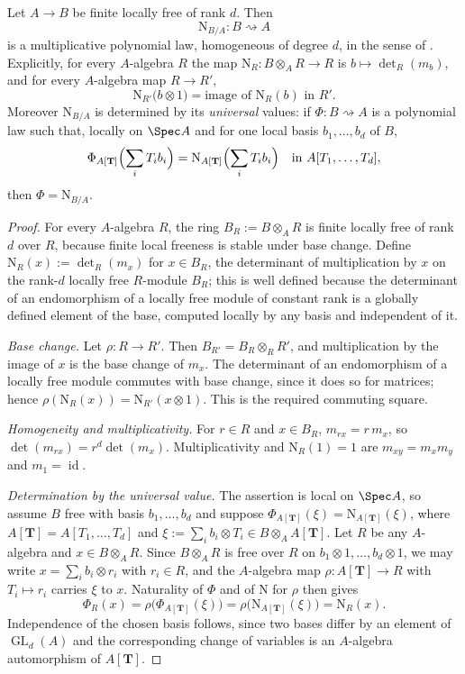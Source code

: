 \begin{proposition}
\label{prop:ch41-norm-law}
Let $A\to B$ be finite locally free of rank $d$.  Then
\[
 \mathrm N_{B/A}:B\rightsquigarrow A
\]
is a multiplicative polynomial law, homogeneous of degree $d$, in the
sense of .  Explicitly, for every
$A$-algebra $R$ the map
$\mathrm N_R:B\otimes_AR\to R$ is
$b\mapsto\det_R(m_b)$, and for every $A$-algebra map $R\to R'$,
\[
 \mathrm N_{R'}\bigl(b\otimes1\bigr)
 =\text{image of }\mathrm N_R(b)\text{ in }R' .
\]
Moreover $\mathrm N_{B/A}$ is determined by its \emph{universal} values:
if $\Phi:B\rightsquigarrow A$ is a polynomial law such that, locally on
$\Spec A$ and for one local basis $b_1,\dots,b_d$ of $B$,
\[
 \Phi_{A[\mathbf T]}\Bigl(\sum_iT_ib_i\Bigr)
 =\mathrm N_{A[\mathbf T]}\Bigl(\sum_iT_ib_i\Bigr)
 \quad\text{in }A[T_1,\dots,T_d],
\]
then $\Phi=\mathrm N_{B/A}$.
\end{proposition}

\begin{proof}
For every $A$-algebra $R$, the ring $B_R:=B\otimes_AR$ is finite
locally free of rank $d$ over $R$, because finite local freeness is
stable under base change.  Define $\mathrm N_R(x):=\det_R(m_x)$ for
$x\in B_R$, the determinant of multiplication by $x$ on the rank-$d$
locally free $R$-module $B_R$; this is well defined because the
determinant of an endomorphism of a locally free module of constant rank is
a globally defined element of the base, computed locally by any basis and
independent of it.

\emph{Base change.}  Let $\rho:R\to R'$.  Then
$B_{R'}=B_R\otimes_RR'$, and multiplication by the image of $x$ is the
base change of $m_x$.  The determinant of an endomorphism of a locally
free module commutes with base change, since it does so for matrices; hence
$\rho(\mathrm N_R(x))=\mathrm N_{R'}(x\otimes1)$.  This is the required
commuting square.

\emph{Homogeneity and multiplicativity.}  For $r\in R$ and $x\in B_R$,
$m_{rx}=r\,m_x$, so $\det(m_{rx})=r^d\det(m_x)$.  Multiplicativity and
$\mathrm N_R(1)=1$ are $m_{xy}=m_xm_y$ and $m_1=\operatorname{id}$.

\emph{Determination by the universal value.}  The assertion is local on
$\Spec A$, so assume $B$ free with basis $b_1,\dots,b_d$ and suppose
$\Phi_{A[\mathbf T]}(\xi)=\mathrm N_{A[\mathbf T]}(\xi)$, where
$A[\mathbf T]=A[T_1,\dots,T_d]$ and
$\xi:=\sum_ib_i\otimes T_i\in B\otimes_AA[\mathbf T]$.  Let $R$ be any
$A$-algebra and $x\in B\otimes_AR$.  Since $B\otimes_AR$ is free over
$R$ on $b_1\otimes1,\dots,b_d\otimes1$, we may write
$x=\sum_ib_i\otimes r_i$ with $r_i\in R$, and the $A$-algebra map
$\rho:A[\mathbf T]\to R$ with $T_i\mapsto r_i$ carries $\xi$ to
$x$.  Naturality of $\Phi$ and of $\mathrm N$ for $\rho$ then gives
\[
 \Phi_R(x)=\rho\bigl(\Phi_{A[\mathbf T]}(\xi)\bigr)
 =\rho\bigl(\mathrm N_{A[\mathbf T]}(\xi)\bigr)
 =\mathrm N_R(x).
\]
Independence of the chosen basis follows, since two bases differ by an
element of $\operatorname{GL}_d(A)$ and the corresponding change of
variables is an $A$-algebra automorphism of $A[\mathbf T]$.
\end{proof}


